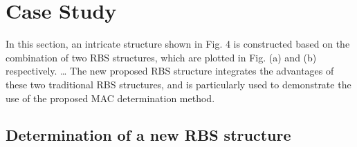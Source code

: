 \documentclass{article}
\begin{document}
\section{Case Study}





In this section, an intricate structure shown in Fig. 4 is constructed based on the combination of two RBS structures, which are plotted in Fig. (a) and (b) respectively. 
… %
The new proposed RBS structure integrates the advantages of these two traditional RBS structures, and is particularly used to demonstrate the use of the proposed MAC determination method.


\subsection{Determination of a new RBS structure}
\end{document}
